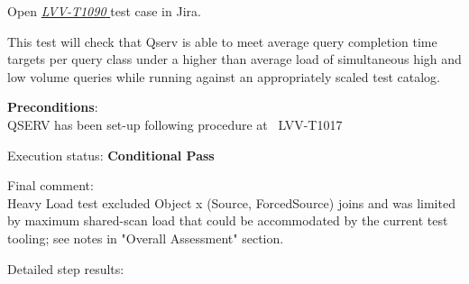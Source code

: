 \documentclass[DM,lsstdraft,STR,toc]{lsstdoc}
\begin{document}
Open  \href{https://jira.lsstcorp.org/secure/Tests.jspa#/testCase/LVV-T1090}{\textit{ LVV-T1090 } }
test case in Jira.

    This test will check that Qserv is able to meet average query completion
time targets per query class under a higher than average load of
simultaneous high and low volume queries while running against an
appropriately scaled test catalog.


    \textbf{ Preconditions}:\\
    QSERV has been set-up following procedure at ~LVV-T1017


    Execution status: {\bf Conditional Pass }

    Final comment:\\Heavy Load test excluded Object x (Source, ForcedSource) joins and was
limited by maximum shared-scan load that could be accommodated by the
current test tooling; see notes in "Overall Assessment" section.



    Detailed step results:
\end{document}
